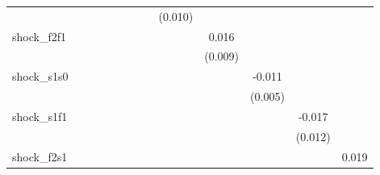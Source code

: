 {\begin{tabular}{l*{12}{c}}
            &                     &                     &                     &                     &                     &                     &                     &     (0.010)         &                     &                     &                     &                     \\
\addlinespace
shock\_f2f1  &                     &                     &                     &                     &                     &                     &                     &                     &       0.016\sym{*}  &                     &                     &                     \\
            &                     &                     &                     &                     &                     &                     &                     &                     &     (0.009)         &                     &                     &                     \\
\addlinespace
shock\_s1s0  &                     &                     &                     &                     &                     &                     &                     &                     &                     &      -0.011\sym{*}  &                     &                     \\
            &                     &                     &                     &                     &                     &                     &                     &                     &                     &     (0.005)         &                     &                     \\
\addlinespace
shock\_s1f1  &                     &                     &                     &                     &                     &                     &                     &                     &                     &                     &      -0.017         &                     \\
            &                     &                     &                     &                     &                     &                     &                     &                     &                     &                     &     (0.012)         &                     \\
\addlinespace
shock\_f2s1  &                     &                     &                     &                     &                     &                     &                     &                     &                     &                     &                     &       0.019\sym{**} \\

\end{tabular}}
